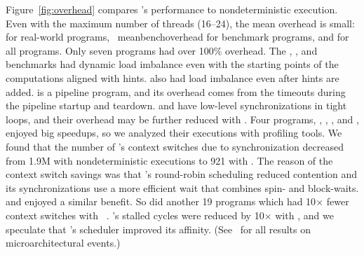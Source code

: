 Figure~\ref{fig:overhead} compares \parrot's performance to nondeterministic
execution.  Even with the maximum number of threads (16--24), the mean
overhead is small: \meanrealoverhead for real-world programs, \
meanbenchoverhead for benchmark
programs, and \meanoverhead for all programs.
Only seven programs had over 100\% overhead.  The \ferret, \freqmine, and \is 
benchmarks
had dynamic load imbalance even with the starting points of the computations
aligned with \compute hints. \ua also had load 
imbalance even after \nondet hints are added.
\xtwosixfour is a pipeline program, and its overhead
comes from the \compute timeouts during the pipeline startup and
teardown.  \rtviewraytrace and \barnes have low-level
synchronizations in tight loops, and their overhead may be further reduced
with \nondets.  Four programs, \mencoder, \bodytrackopenmp, \facesim, and
\linearregrepthread, enjoyed big speedups, so we analyzed their 
executions with profiling tools. We found that the number of \mencoder's 
context switches due to synchronization decreased from 1.9M with
nondeterministic executions to 921 with \parrot.  The reason of the context
switch savings was that \parrot's round-robin scheduling reduced contention
and its synchronizations use a more efficient wait that combines spin- and
block-waits.  \bodytrackopenmp and \facesim
enjoyed a similar benefit.  So did another 19 programs which had
10$\times$ fewer context switches with
\parrot~\cite{Parrot:github}. \linearregrepthread's stalled cycles were
reduced by 10$\times$ with \parrot, and we speculate that \parrot's scheduler
improved its affinity. (See~\cite{Parrot:github} for all results on
microarchitectural events.)



